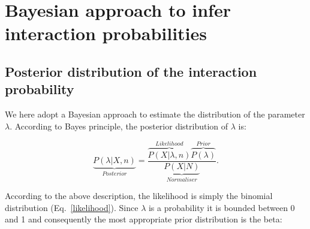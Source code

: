 \documentclass[12pt]{article}
\begin{document}





\section*{Bayesian approach to infer interaction probabilities}

    \subsection*{Posterior distribution of the interaction probability}


      We here adopt a Bayesian approach to estimate the distribution of the parameter $\lambda$. According to Bayes principle, the posterior distribution of $\lambda$ is:

      \begin{equation}
        \underbrace{P(\lambda|X,n)}_{Posterior} = \frac{\overbrace{P(X|\lambda,n)}^{Likelihood}\overbrace{P(\lambda)}^{Prior}}{\underbrace{P(X|N)}_{Normaliser}} .
        \label{posterior}
      \end{equation}

      According to the above description, the likelihood is simply the binomial distribution (Eq.~\ref{likelihood}). Since $\lambda$ is a probability it is bounded between 0 and 1 and consequently the most appropriate prior distribution is the beta:
\end{document}
